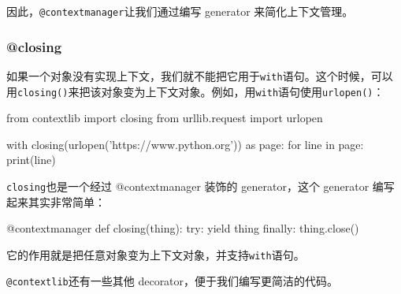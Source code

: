 因此，\texttt{@contextmanager}让我们通过编写 generator
来简化上下文管理。

\hypertarget{closing}{%
\subsubsection{@closing}\label{closing}}

如果一个对象没有实现上下文，我们就不能把它用于\texttt{with}语句。这个时候，可以用\texttt{closing()}来把该对象变为上下文对象。例如，用\texttt{with}语句使用\texttt{urlopen()}：

\begin{pythoncode}
from contextlib import closing
from urllib.request import urlopen

with closing(urlopen('https://www.python.org')) as page:
    for line in page:
        print(line)
\end{pythoncode}

\texttt{closing}也是一个经过 @contextmanager 装饰的 generator，这个
generator 编写起来其实非常简单：

\begin{pythoncode}
@contextmanager
def closing(thing):
    try:
        yield thing
    finally:
        thing.close()
\end{pythoncode}

它的作用就是把任意对象变为上下文对象，并支持\texttt{with}语句。

\texttt{@contextlib}还有一些其他 decorator，便于我们编写更简洁的代码。

